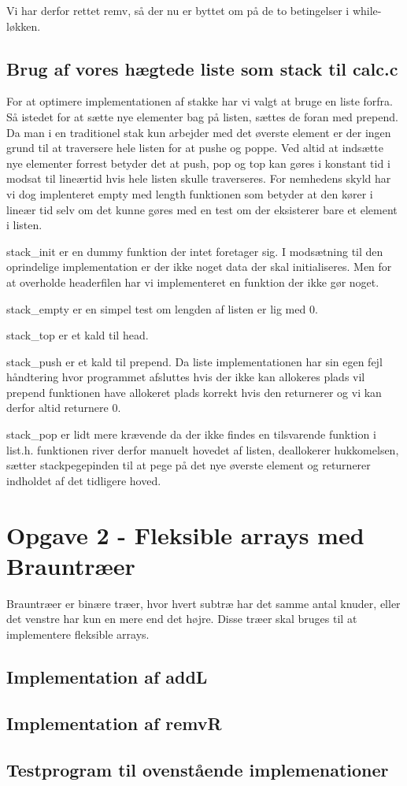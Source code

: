 \documentclass[10pt,a4paper,danish]{article}
\begin{document}
Vi har derfor rettet remv, så der nu er byttet om på de to betingelser i while-løkken.

\subsection{Brug af vores hægtede liste som stack til calc.c}

For at optimere implementationen af stakke har vi valgt at bruge en liste forfra.
Så istedet for at sætte nye elementer bag på listen, sættes de foran med prepend.
Da man i en traditionel stak kun arbejder med det øverste element er der ingen grund til at traversere hele listen for at pushe og poppe. Ved altid at indsætte nye elementer forrest betyder det at push, pop og top kan gøres i konstant tid i modsat til lineærtid hvis hele listen skulle traverseres. For nemhedens skyld har vi dog implenteret empty med length funktionen som betyder at den kører i lineær tid selv om det kunne gøres med en test om der eksisterer bare et element i listen.


stack_init er en dummy funktion der intet foretager sig.
I modsætning til den oprindelige implementation er der ikke noget data der skal initialiseres. Men for at overholde headerfilen har vi implementeret en funktion der ikke gør noget.

stack_empty er en simpel test om lengden af listen er lig med 0.

stack_top er et kald til head.

stack_push er et kald til prepend.
Da liste implementationen har sin egen fejl håndtering hvor programmet afsluttes hvis der ikke kan allokeres plads vil prepend funktionen have allokeret plads korrekt hvis den returnerer og vi kan derfor altid returnere 0.

stack_pop er lidt mere krævende da der ikke findes en tilsvarende funktion i list.h.
funktionen river derfor manuelt hovedet af listen, deallokerer hukkomelsen, sætter stackpegepinden til at pege på det nye øverste element og returnerer indholdet af det tidligere hoved.

\section{Opgave 2 - Fleksible arrays med Brauntræer}
Brauntræer er binære træer, hvor hvert subtræ har det samme antal knuder, eller det venstre har kun en mere end det højre. Disse træer skal bruges til at implementere fleksible arrays.

\subsection{Implementation af addL}

\subsection{Implementation af remvR}

\subsection{Testprogram til ovenstående implemenationer}
\end{document}
